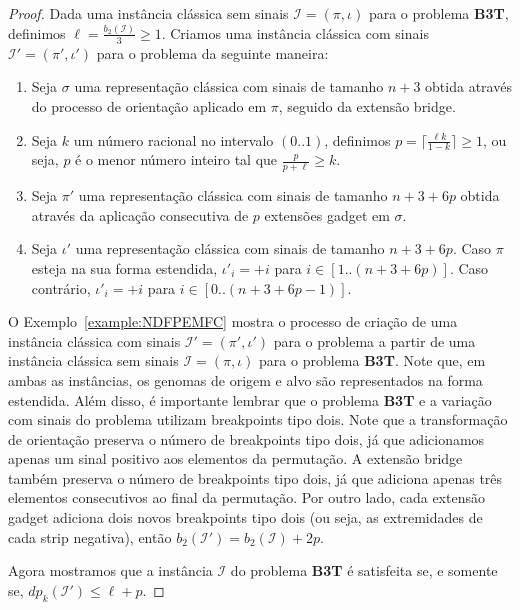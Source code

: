 \begin{proof}
Dada uma instância clássica sem sinais $\mathcal{I}=(\pi,\iota)$ para o problema \textbf{B3T}, definimos $\ell = \frac{b_2(\mathcal{I})}{3} \ge 1$. Criamos uma instância clássica com sinais $\mathcal{I'}=(\pi',\iota')$ para o problema \SbPRT{} da seguinte maneira:

\begin{enumerate}
  \item Seja $\sigma$ uma representação clássica com sinais de tamanho $n+3$ obtida através do processo de orientação aplicado em $\pi$, seguido da extensão bridge.
  \item Seja $k$ um número racional no intervalo $(0..1)$, definimos $p = \lceil\frac{\ell k}{1-k}\rceil \ge 1$, ou seja, $p$ é o menor número inteiro tal que $\frac{p}{p+\ell} \ge k$.
  \item Seja $\pi'$ uma representação clássica com sinais de tamanho $n+3+6p$ obtida através da aplicação consecutiva de $p$ extensões gadget em $\sigma$.
  \item Seja $\iota'$ uma representação clássica com sinais de tamanho $n+3+6p$. Caso $\pi$ esteja na sua forma estendida, $\iota'_i = +i$ para $i \in [1..(n+3+6p)]$. Caso contrário,  $\iota'_i = +i$ para $i \in [0..(n+3+6p-1)]$.
\end{enumerate}

O Exemplo~\ref{example:NDFPEMFC} mostra o processo de criação de uma instância clássica com sinais $\mathcal{I'}=(\pi',\iota')$ para o problema \SbPRT{} a partir de uma instância clássica sem sinais $\mathcal{I}=(\pi,\iota)$ para o problema \textbf{B3T}. Note que, em ambas as instâncias, os genomas de origem e alvo são representados na forma estendida. Além disso, é importante lembrar que o problema \textbf{B3T} e a variação com sinais do problema \SbPRT{} utilizam breakpoints tipo dois. Note que a transformação de orientação preserva o número de breakpoints tipo dois, já que adicionamos apenas um sinal positivo aos elementos da permutação. A extensão bridge também preserva o número de breakpoints tipo dois, já que adiciona apenas três elementos consecutivos ao final da permutação. Por outro lado, cada extensão gadget adiciona dois novos breakpoints tipo dois (ou seja, as extremidades de cada strip negativa), então $b_2(\mathcal{I'}) = b_2(\mathcal{I}) +2p$.

Agora mostramos que a instância $\mathcal{I}$ do problema \textbf{B3T} é satisfeita se, e somente se, $dp_k(\mathcal{I'}) \le \ell+p$.


\end{proof}
